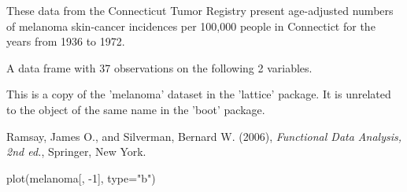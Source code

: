 \documentclass{article}
\begin{document}
\begin{Description}\relax
These data from the Connecticut Tumor Registry present
age-adjusted numbers of melanoma skin-cancer incidences per
100,000 people in Connectict for the years from 1936 to 1972.
\end{Description}
\begin{Format}\relax
A data frame with 37 observations on the following 2 variables.
\end{Format}
\begin{Details}\relax
This is a copy of the 'melanoma' dataset in the 'lattice' package.  It
is unrelated to the object of the same name in the 'boot' package.
\end{Details}
\begin{Source}\relax
Ramsay, James O., and Silverman, Bernard W. (2006), \emph{Functional
Data Analysis, 2nd ed.}, Springer, New York.
\end{Source}
\begin{SeeAlso}\relax
{}
\end{SeeAlso}
\begin{Examples}
\begin{ExampleCode}
plot(melanoma[, -1], type="b")
\end{ExampleCode}
\end{Examples}
\end{document}
